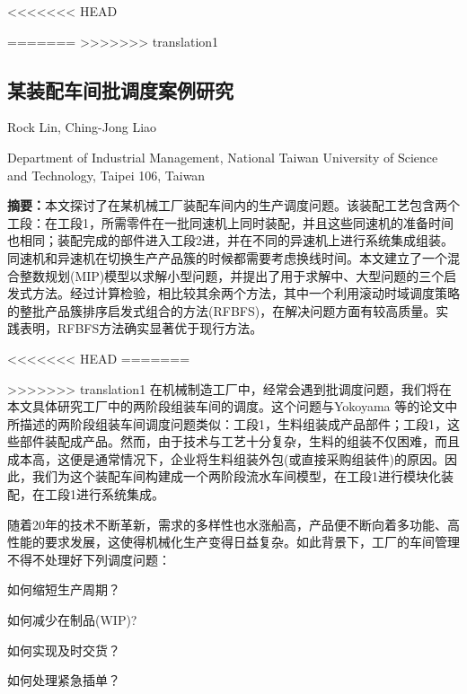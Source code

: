 <<<<<<< HEAD

=======
>>>>>>> translation1
\begin{Abstract}
\chapter*{某装配车间批调度案例研究}
\begin{center}
\vspace{2mm}
{
 {\xiaosi Rock Lin, Ching-Jong Liao}

 {\xiaowu Department of Industrial Management, National Taiwan University of Science and Technology, Taipei 106, Taiwan}
}
\end{center}
{\songti 
\noindent \xiaowu\textbf{摘要：}本文探讨了在某机械工厂装配车间内的生产调度问题。该装配工艺包含两个工段：在工段1，所需零件在一批同速机上同时装配，并且这些同速机的准备时间也相同；装配完成的部件进入工段2进，并在不同的异速机上进行系统集成组装。同速机和异速机在切换生产产品簇的时候都需要考虑换线时间。本文建立了一个混合整数规划(MIP)模型以求解小型问题，并提出了用于求解中、大型问题的三个启发式方法。经过计算检验，相比较其余两个方法，其中一个利用滚动时域调度策略的整批产品簇排序启发式组合的方法(RFBFS)，在解决问题方面有较高质量。实践表明，RFBFS方法确实显著优于现行方法。

}
\end{Abstract}

<<<<<<< HEAD
=======

>>>>>>> translation1
在机械制造工厂中，经常会遇到批调度问题，我们将在本文具体研究工厂中的两阶段组装车间的调度。这个问题与Yokoyama 等的论文中所描述的两阶段组装车间调度问题类似：工段1，生料组装成产品部件；工段1，这些部件装配成产品。然而，由于技术与工艺十分复杂，生料的组装不仅困难，而且成本高，这便是通常情况下，企业将生料组装外包(或直接采购组装件)的原因。因此，我们为这个装配车间构建成一个两阶段流水车间模型，在工段1进行模块化装配，在工段1进行系统集成。

随着20年的技术不断革新，需求的多样性也水涨船高，产品便不断向着多功能、高性能的要求发展，这使得机械化生产变得日益复杂。如此背景下，工厂的车间管理不得不处理好下列调度问题：
\begin{compactenum}[(1)]
\item 如何缩短生产周期？
\item 如何减少在制品(WIP)?
\item 如何实现及时交货？
\item 如何处理紧急插单？
\end{compactenum}

